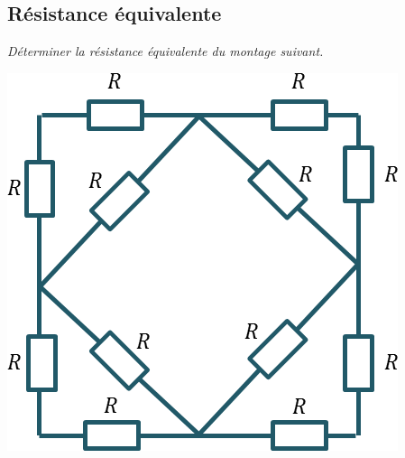 \documentclass[10pt,fleqn]{article} %
\begin{document}
\begin{multicols}{2}
\section*{Résistance équivalente}
\textit{Déterminer la résistance équivalente du montage suivant.}
\begin{center}
\includegraphics[width=\linewidth]{images/fig_05}
\end{center}


\end{multicols}
\end{document}
